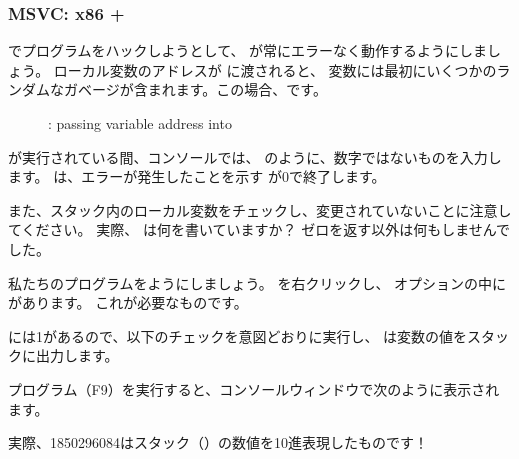 \clearpage
\subsubsection{MSVC: x86 + \olly}

\olly でプログラムをハックしようとして、 \scanf が常にエラーなく動作するようにしましょう。 
ローカル変数のアドレスが \scanf に渡されると、
変数には最初にいくつかのランダムなガベージが含まれます。この場合、です。

\begin{figure}[H]
\centering
{}
\caption{\olly: passing variable address into \scanf}
\label{fig:scanf_ex3_olly_1}
\end{figure}

\clearpage
\scanf が実行されている間、コンソールでは、 のように、数字ではないものを入力します。 
\scanf は、エラーが発生したことを示す \EAX が0で終了します。

また、スタック内のローカル変数をチェックし、変更されていないことに注意してください。 
実際、 \scanf は何を書いていますか？ 
ゼロを返す以外は何もしませんでした。

私たちのプログラムをようにしましょう。 
\EAX を右クリックし、
オプションの中にがあります。 
これが必要なものです。

\EAX には1があるので、以下のチェックを意図どおりに実行し、
\printf は変数の値をスタックに出力します。 

プログラム（F9）を実行すると、コンソールウィンドウで次のように表示されます。



実際、1850296084はスタック（）の数値を10進表現したものです！
